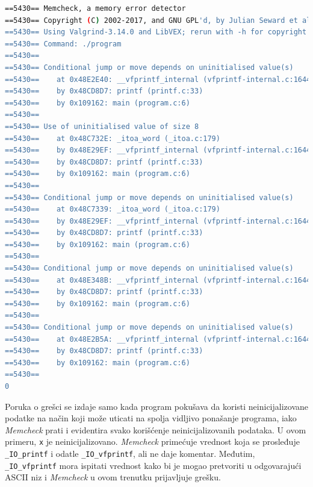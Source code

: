 \documentclass[12pt,oneside]{memoir}
\theoremstyle{plain}
\theoremstyle{definition}
\begin{document}


\begin{lstlisting}[style=terminal,caption={Primer ispisa greške korišćenja neinicijalizovanih vrednosti}, label={lst:slika2.5},language={bash}] 
==5430== Memcheck, a memory error detector
==5430== Copyright (C) 2002-2017, and GNU GPL'd, by Julian Seward et al. 
==5430== Using Valgrind-3.14.0 and LibVEX; rerun with -h for copyright info 
==5430== Command: ./program
==5430==
==5430== Conditional jump or move depends on uninitialised value(s)
==5430==	at 0x48E2E40: __vfprintf_internal (vfprintf-internal.c:1644)
==5430==	by 0x48CD8D7: printf (printf.c:33)
==5430==	by 0x109162: main (program.c:6)
==5430==
==5430== Use of uninitialised value of size 8
==5430==	at 0x48C732E: _itoa_word (_itoa.c:179)
==5430==	by 0x48E29EF: __vfprintf_internal (vfprintf-internal.c:1644)
==5430==	by 0x48CD8D7: printf (printf.c:33)
==5430==	by 0x109162: main (program.c:6)
==5430==
==5430== Conditional jump or move depends on uninitialised value(s)
==5430==	at 0x48C7339: _itoa_word (_itoa.c:179)
==5430==	by 0x48E29EF: __vfprintf_internal (vfprintf-internal.c:1644)
==5430==	by 0x48CD8D7: printf (printf.c:33)
==5430==	by 0x109162: main (program.c:6)
==5430==
==5430== Conditional jump or move depends on uninitialised value(s)
==5430==	at 0x48E348B: __vfprintf_internal (vfprintf-internal.c:1644)
==5430==	by 0x48CD8D7: printf (printf.c:33)
==5430==	by 0x109162: main (program.c:6)
==5430==
==5430== Conditional jump or move depends on uninitialised value(s)
==5430==	at 0x48E2B5A: __vfprintf_internal (vfprintf-internal.c:1644)
==5430==	by 0x48CD8D7: printf (printf.c:33)
==5430==	by 0x109162: main (program.c:6)
==5430==
0
\end{lstlisting}

Poruka o grešci se izdaje samo kada program pokušava da koristi neinicijalizovane podatke na način koji može uticati na spolja vidljivo ponašanje programa, iako \textit{Memcheck} prati i evidentira svako korišćenje neinicijalizovanih podataka. U ovom primeru, \texttt{x} je neinicijalizovano. \textit{Memcheck} primećuje vrednost koja se prosleđuje \texttt{\_IO\_printf} i odatle \texttt{\_IO\_vfprintf}, ali ne daje komentar. Međutim, \texttt{\_IO\_vfprintf} mora ispitati vrednost  kako bi je mogao pretvoriti u odgovarajući ASCII niz i \textit{Memcheck} u ovom trenutku prijavljuje grešku.
\end{document}

